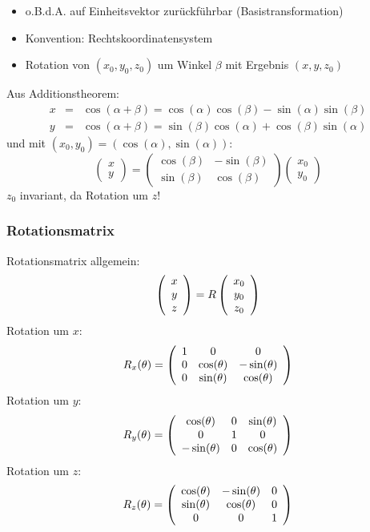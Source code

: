\begin{itemize}
\item o.B.d.A. auf Einheitsvektor zurückführbar (Basistransformation)
\item Konvention: Rechtskoordinatensystem
\item Rotation von $(x_0,y_0,z_0)$ um Winkel $\beta$ mit Ergebnis $(x,y,z_0)$
\end{itemize}
Aus Additionstheorem:
\begin{eqnarray*}
x &=& \cos(\alpha + \beta) = \cos(\alpha) \cos(\beta) - \sin(\alpha) \sin(\beta) \\ y &=& \cos(\alpha + \beta) = \sin(\beta) \cos(\alpha) + \cos(\beta) \sin(\alpha)
\end{eqnarray*}
und mit $(x_0,y_0) = (\cos(\alpha), \sin(\alpha))$:
$$\left( \begin{array}{c} x \\ y \end{array} \right) = \left( \begin{array}{rr} \cos(\beta) & -\sin(\beta) \\ \sin(\beta) & \cos(\beta) \end{array} \right) \left( \begin{array}{c} x_0 \\ y_0 \end{array} \right)$$
$z_0$ invariant, da Rotation um $z$!

\subsubsection{Rotationsmatrix}

Rotationsmatrix allgemein: $$\left( \begin{array}{c} x \\ y \\ z \end{array} \right) = R \left( \begin{array}{c} x_0 \\ y_0 \\ z_0 \end{array} \right)$$
Rotation um $x$: $$R_x(\theta) = \left( \begin{array}{ccc} 1 & 0 & 0 \\ 0 & \cos(\theta) & - \sin(\theta) \\ 0 & \sin(\theta) & \cos(\theta) \end{array} \right)$$
Rotation um $y$: $$R_y(\theta) = \left( \begin{array}{ccc} \cos(\theta) & 0 & \sin(\theta) \\ 0 & 1 & 0 \\ - \sin(\theta) & 0 & \cos(\theta) \end{array} \right)$$
Rotation um $z$: $$R_z(\theta) = \left( \begin{array}{ccc} \cos(\theta) & - \sin(\theta) & 0 \\ \sin(\theta) & \cos(\theta) & 0 \\ 0 & 0 & 1 \end{array} \right)$$

